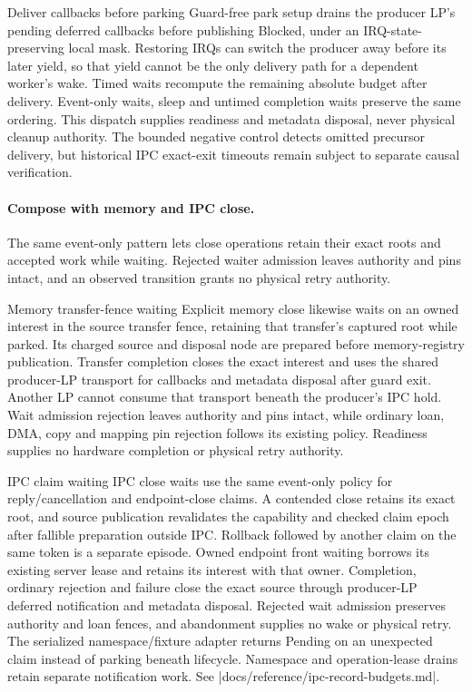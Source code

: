 \begin{implementationdetail}{Deliver callbacks before parking}
Guard-free park setup drains the producer LP's pending deferred callbacks
before publishing Blocked, under an IRQ-state-preserving local mask. Restoring
IRQs can switch the producer away before its later yield, so that yield
cannot be the only delivery path for a dependent worker's wake. Timed waits
recompute the remaining absolute budget after delivery. Event-only waits,
sleep and untimed completion waits preserve the same ordering. This dispatch
supplies readiness and metadata disposal, never physical cleanup authority.
The bounded negative control detects omitted precursor delivery, but historical
IPC exact-exit timeouts remain subject to separate causal verification.
\end{implementationdetail}

\paragraph*{Compose with memory and IPC close.}

The same event-only pattern lets close operations retain their exact roots and
accepted work while waiting. Rejected waiter admission leaves authority and
pins intact, and an observed transition grants no physical retry authority.

\begin{implementationdetail}{Memory transfer-fence waiting}
Explicit memory close likewise waits on an owned interest in the source
transfer fence, retaining that transfer's captured root while parked. Its
charged source and disposal node are prepared before memory-registry publication.
Transfer completion closes the exact interest and uses the shared producer-LP
transport for callbacks and metadata disposal after guard exit. Another LP
cannot consume that transport beneath the producer's IPC hold. Wait admission
rejection leaves authority and pins intact, while ordinary loan, DMA, copy and mapping
pin rejection follows its existing policy. Readiness supplies no hardware
completion or physical retry authority.
\end{implementationdetail}

\begin{implementationdetail}{IPC claim waiting}
IPC close waits use the same event-only policy for reply/cancellation and
endpoint-close claims. A contended close retains its exact root, and source
publication revalidates the capability and checked claim epoch after fallible
preparation outside IPC. Rollback followed by another claim on the same token
is a separate episode. Owned endpoint front waiting borrows its existing server
lease and retains its interest with that owner. Completion, ordinary rejection
and failure close the exact source through producer-LP deferred notification and
metadata disposal. Rejected wait admission preserves authority and loan fences, and
abandonment supplies no wake or physical retry. The serialized namespace/fixture
adapter returns Pending on an unexpected claim instead of parking beneath
lifecycle. Namespace and operation-lease drains retain separate notification
work. See \repofile|docs/reference/ipc-record-budgets.md|.
\end{implementationdetail}

